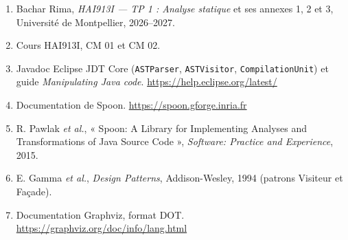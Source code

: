 \documentclass[11pt,a4paper]{article}
\begin{document}
\begin{enumerate}
    \item Bachar Rima, \textit{HAI913I --- TP 1 : Analyse statique} et ses annexes 1, 2 et 3, Université de Montpellier, 2026--2027.
    \item Cours HAI913I, CM 01 et CM 02.
    \item Javadoc Eclipse JDT Core (\texttt{ASTParser}, \texttt{ASTVisitor}, \texttt{CompilationUnit}) et guide \textit{Manipulating Java code}. \url{https://help.eclipse.org/latest/}
    \item Documentation de Spoon. \url{https://spoon.gforge.inria.fr}
    \item R. Pawlak \textit{et al.}, « Spoon: A Library for Implementing Analyses and Transformations of Java Source Code », \textit{Software: Practice and Experience}, 2015.
    \item E. Gamma \textit{et al.}, \textit{Design Patterns}, Addison-Wesley, 1994 (patrons Visiteur et Façade).
    \item Documentation Graphviz, format DOT. \url{https://graphviz.org/doc/info/lang.html}
\end{enumerate}
\end{document}
